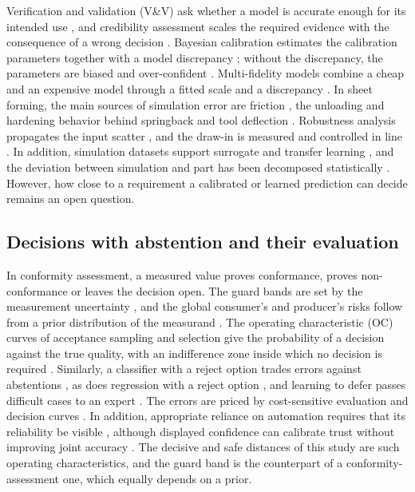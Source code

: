 \documentclass[pdflatex,sn-basic,lineno]{sn-jnl}
\begin{document}
Verification and validation (V\&V) ask whether a model is accurate enough for its intended use \citep{oberkampf2010verification}, and credibility assessment scales the required evidence with the consequence of a wrong decision \citep{asme2018assessing}. Bayesian calibration estimates the calibration parameters together with a model discrepancy \citep{kennedy2001bayesian, higdon2004combining}; without the discrepancy, the parameters are biased and over-confident \citep{brynjarsdottir2014learning, arendt2012quantification}. Multi-fidelity models combine a cheap and an expensive model through a fitted scale and a discrepancy \citep{kennedy2000predicting, legratiet2014recursive}. In sheet forming, the main sources of simulation error are friction \citep{hol2012advanced}, the unloading and hardening behavior behind springback \citep{yoshida2002model, wagoner2013advanced} and tool deflection \citep{pilthammar2018introduction}. Robustness analysis propagates the input scatter \citep{wiebenga2014effect, chen2022robustness}, and the draw-in is measured and controlled in line \citep{havinga2020exploiting, fischer2018implementation}. In addition, simulation datasets support surrogate and transfer learning \citep{baum2025ddacs, heinzelmann2025comprehensive}, and the deviation between simulation and part has been decomposed statistically \citep{baum2026statistical}. However, how close to a requirement a calibrated or learned prediction can decide remains an open question.

\subsection{Decisions with abstention and their evaluation}

In conformity assessment, a measured value proves conformance, proves non-conformance or leaves the decision open. The guard bands are set by the measurement uncertainty \citep{iso2017decision}, and the global consumer's and producer's risks follow from a prior distribution of the measurand \citep{jcgm2012evaluation}. The operating characteristic (OC) curves of acceptance sampling and selection give the probability of a decision against the true quality, with an indifference zone inside which no decision is required \citep{bechhofer1954single}. Similarly, a classifier with a reject option trades errors against abstentions \citep{chow1970optimum, geifman2017selective}, as does regression with a reject option \citep{zaoui2020regression}, and learning to defer passes difficult cases to an expert \citep{madras2018predict}. The errors are priced by cost-sensitive evaluation \citep{elkan2001foundations} and decision curves \citep{vickers2006decision}. In addition, appropriate reliance on automation requires that its reliability be visible \citep{lee2004trust}, although displayed confidence can calibrate trust without improving joint accuracy \citep{zhang2020effect, zhang2021cautionary}. The decisive and safe distances of this study are such operating characteristics, and the guard band is the counterpart of a conformity-assessment one, which equally depends on a prior.
\end{document}
